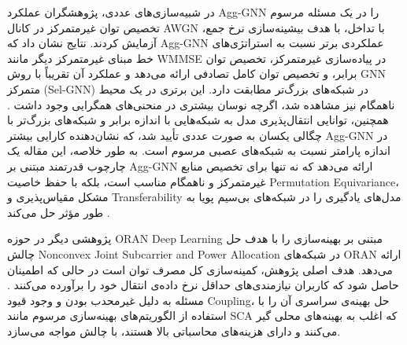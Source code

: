 در شبیه‌سازی‌های عددی، پژوهشگران عملکرد 
\gls{Agg-GNN}
را در یک مسئله مرسوم تخصیص توان غیرمتمرکز در کانال 
\gls{AWGN}
با تداخل، با هدف بیشینه‌سازی نرخ جمع، آزمایش کردند. نتایج نشان داد که 
\gls{Agg-GNN}
عملکردی برتر نسبت به استراتژی‌های خط مبنای غیرمتمرکز دیگر مانند 
\gls{WMMSE}
در پیاده‌سازی غیرمتمرکز، تخصیص توان برابر، و تخصیص توان کامل تصادفی ارائه می‌دهد و عملکرد آن تقریباً با روش 
\gls{GNN}
متمرکز (Sel-GNN) در شبکه‌های بزرگ‌تر مطابقت دارد. این برتری در یک محیط ناهمگام نیز مشاهده شد، اگرچه نوسان بیشتری در منحنی‌های همگرایی وجود داشت . همچنین، توانایی انتقال‌پذیری مدل به شبکه‌هایی با اندازه برابر و شبکه‌های بزرگ‌تر با چگالی یکسان به صورت عددی تأیید شد، که نشان‌دهنده کارایی بیشتر 
\gls{Agg-GNN}
در اندازه پارامتر نسبت به شبکه‌های عصبی مرسوم است.
به طور خلاصه، این مقاله یک چارچوب قدرتمند مبتنی بر 
\gls{Agg-GNN}
ارائه می‌دهد که نه تنها برای تخصیص منابع غیرمتمرکز و ناهمگام مناسب است، بلکه با حفظ خاصیت 
\gls{Permutation Equivariance}،
مشکل مقیاس‌پذیری و 
\gls{Transferability}
مدل‌های یادگیری را در شبکه‌های بی‌سیم پویا به طور مؤثر حل می‌کند
\cite{LearningDecentralize}.

پژوهشی دیگر در حوزه 
\gls{ORAN}
\gls{Deep Learning}
مبتنی بر بهینه‌سازی را با هدف حل چالش 
\gls{Nonconvex}
\gls{Joint Subcarrier and Power Allocation}
در شبکه‌های ORAN ارائه می‌دهد. هدف اصلی  پژوهش، کمینه‌سازی کل مصرف توان است در حالی که اطمینان حاصل شود که کاربران نیازمندی‌های حداقل نرخ داده‌ی انتقال خود را برآورده می‌کنند .  مسئله به دلیل غیرمحدب بودن و وجود قیود 
\gls{Coupling}،
 حل بهینه‌ی سراسری آن را با استفاده از الگوریتم‌های بهینه‌سازی مرسوم مانند 
\gls{SCA}
که اغلب به بهینه‌های محلی گیر می‌کنند و دارای هزینه‌های محاسباتی بالا هستند، با چالش مواجه می‌سازد.

